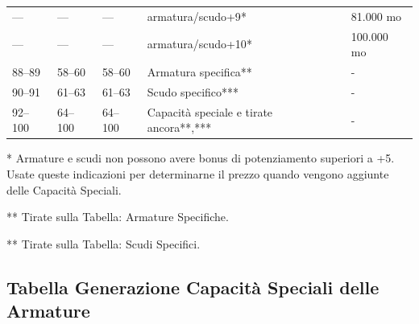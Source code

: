\documentclass[a4paper,11pt,twoside,openany]{book}
\begin{document}
\begin{tabularx}{\textwidth}{XXXXX}
	---             & ---            & ---               & armatura/scudo+9{*}                               & 81.000 mo\tabularnewline
	---             & ---            & ---               & armatura/scudo+10{*}                              & 100.000 mo\tabularnewline
	88--89          & 58--60         & 58--60            & Armatura specifica{*}{*}                          & -\tabularnewline
	90--91          & 61--63         & 61--63            & Scudo specifico{*}{*}{*}                          & -\tabularnewline
	92--100         & 64--100        & 64--100           & Capacità speciale e tirate ancora{*}{*},{*}{*}{*} & -\tabularnewline
\end{tabularx}

{*} Armature e scudi non possono avere bonus di potenziamento superiori a +5. Usate queste indicazioni per determinarne il prezzo quando vengono aggiunte delle Capacità Speciali.

	{*}{*} Tirate sulla Tabella: Armature Specifiche.

	{*}{*} Tirate sulla Tabella: Scudi Specifici.



\subsection{Tabella Generazione Capacità Speciali delle Armature}

\label{tabella-generazione-capacita-speciali-delle-armature}
\end{document}
